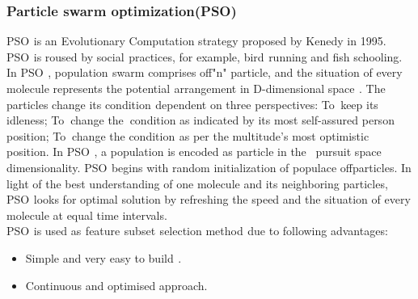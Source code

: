 \documentclass[oneside,12pt]{Classes/VTU}
\begin{document}
    \subsubsection{Particle swarm optimization(PSO)}           
    PSO\tiny\textcolor{white}{s}\normalsize is an\tiny\textcolor{white}{t}\normalsize Evolutionary Computation strategy proposed by Kenedy in 1995. PSO\tiny\textcolor{white}{s}\normalsize is roused by social\tiny\textcolor{white}{s}\normalsize practices, for example, bird\tiny\textcolor{white}{s}\normalsize running and fish schooling. In PSO\tiny\textcolor{white}{s}\normalsize , population\tiny\textcolor{white}{s}\normalsize swarm comprises of\tiny\textcolor{white}{f}\normalsize "n" particle, and the situation of every molecule represents the potential\tiny\textcolor{white}{s}\normalsize arrangement in D-dimensional space\tiny\textcolor{white}{s}\normalsize. The particles change its condition\tiny\textcolor{white}{s}\normalsize dependent on three perspectives: To\tiny\textcolor{white}{o}\normalsize keep its idleness; To\tiny\textcolor{white}{o}\normalsize change the\tiny\textcolor{white}{n}\normalsize condition as indicated by its most self-assured person position; To\tiny\textcolor{white}{o}\normalsize change the condition\tiny\textcolor{white}{s}\normalsize as per the multitude's most optimistic position. In PSO\tiny\textcolor{white}{s}\normalsize, a population is encoded as particle in the\tiny\textcolor{white}{m}\normalsize pursuit space dimensionality. PSO\tiny\textcolor{white}{s}\normalsize begins with random initialization of populace of\tiny\textcolor{white}{f}\normalsize particles. In light of the best understanding of one molecule and its neighboring particles, PSO\tiny\textcolor{white}{s}\normalsize looks for optimal solution by refreshing the speed and the situation of every molecule at equal time intervals.
    \\
    PSO\tiny\textcolor{white}{s}\normalsize is used as\tiny\textcolor{white}{s}\normalsize feature\tiny\textcolor{white}{s}\normalsize subset\tiny\textcolor{white}{s}\normalsize selection method\tiny\textcolor{white}{s}\normalsize due to following advantages:
    
    \begin{itemize}
    	\item Simple and very easy to build\tiny\textcolor{white}{s}\normalsize.
    	\item Continuous and optimised approach.
    \end{itemize}
\end{document}
